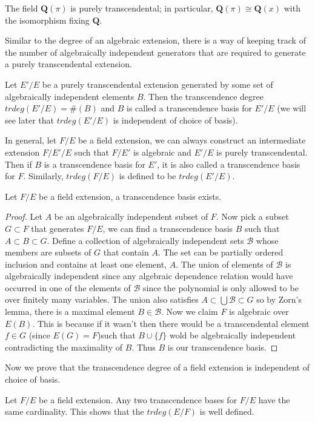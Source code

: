 \begin{example} The field $\mathbf{Q}(\pi)$ is purely transcendental; in
particular, $\mathbf{Q}(\pi)\cong\mathbf{Q}(x)$ with the isomorphism fixing
$\mathbf{Q}$. \end{example}
Similar to the degree of an algebraic extension, there is a way of keeping
track of the number of algebraically independent generators that are required to
generate a purely transcendental extension.
\begin{definition} Let $E'/E$ be a purely transcendental extension generated by
some set of algebraically independent elements $B$. Then the transcendence
degree $trdeg(E'/E)=\#(B)$ and $B$ is called a transcendence basis for $E'/E$
(we will see later that $trdeg(E'/E)$ is independent of choice of basis).
\end{definition}
In general, let $F/E$ be a field extension, we can always construct an
intermediate extension $F/E'/E$ such that $F/E'$ is algebraic and $E'/E$ is
purely transcendental. Then if $B$ is a transcendence basis for $E'$, it is
also called a transcendence basis for $F$. Similarly, $trdeg(F/E)$ is defined to
be
$trdeg(E'/E)$.
\begin{theorem} Let $F/E$ be a field extension, a transcendence basis exists.
\end{theorem}
\begin{proof} Let $A$ be an algebraically independent subset of $F$. Now pick a
subset $G\subset F$ that generates $F/E$, we can find a transcendence basis
$B$ such that $A\subset B\subset G$. Define a collection of algebraically
independent sets $\mathcal{B}$ whose members are subsets of $G$ that contain
$A$. The set can be partially ordered inclusion and contains at least one
element, $A$. The union of elements of $\mathcal{B}$ is algebraically
independent since any algebraic dependence relation would have occurred in one
of the elements of $\mathcal{B}$ since the polynomial is only allowed to be over
finitely many variables. The union also satisfies $A\subset
\bigcup\mathcal{B}\subset G$ so by Zorn's lemma, there is a maximal element
$B\in\mathcal{B}$. Now we claim $F$ is algebraic over $E(B)$. This is because
if it wasn't then there would be a transcendental element $f\in G$ (since
$E(G)=F$)such that $B\cup\{f\}$ wold be algebraically independent contradicting
the
maximality of $B$. Thus $B$ is our transcendence basis. \end{proof}
Now we prove that the transcendence degree of a field extension is independent
of choice of basis.
\begin{theorem} Let $F/E$ be a field extension. Any two transcendence bases for
$F/E$ have the same cardinality. This shows that the $trdeg(E/F)$ is well
defined. \end{theorem}
